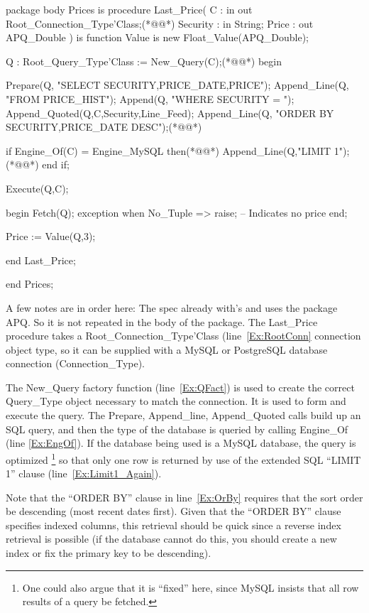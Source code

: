 \documentclass[english,letterpaper]{book}
\begin{document}
\begin{NumberedExample}
package body Prices is
   procedure Last_Price(
      C :        in out Root_Connection_Type'Class;(*@\label{Ex:RootConn}@*)
      Security : in     String;
      Price :       out APQ_Double
   ) is
      function Value is new Float_Value(APQ_Double);
  
      Q : Root_Query_Type'Class := New_Query(C);(*@\label{Ex:QFact}@*)
   begin
  
      Prepare(Q,     "SELECT SECURITY,PRICE_DATE,PRICE");
      Append_Line(Q, "FROM PRICE_HIST");
      Append(Q,      "WHERE SECURITY = ");
      Append_Quoted(Q,C,Security,Line_Feed);
      Append_Line(Q, "ORDER BY SECURITY,PRICE_DATE DESC");(*@\label{Ex:OrBy}@*)
 
      if Engine_Of(C) = Engine_MySQL then(*@\label{Ex:EngOf}@*)
         Append_Line(Q,"LIMIT 1");(*@\label{Ex:Limit1_Again}@*)
      end if;
 
      Execute(Q,C);
 
      begin
         Fetch(Q);
      exception
          when No_Tuple =>
             raise;    -- Indicates no price
      end;
 
      Price := Value(Q,3);
 
   end Last_Price;
 
end Prices;
\end{NumberedExample}

A few notes are in order here: The spec already with's and uses the
package APQ. So it is not repeated in the body of the package. The
Last\_Price procedure takes a Root\_Connection\_Type'Class
(line~\ref{Ex:RootConn} connection object type, so it can be supplied
with a MySQL or PostgreSQL database connection (Connection\_Type).

The New\_Query factory function (line~\ref{Ex:QFact}) is used to create
the correct Query\_Type object necessary to match the connection. It is
used to form and execute the query. The Prepare, Append\_line,
Append\_Quoted calls build up an SQL query, and then the type of the
database is queried by calling Engine\_Of (line \ref{Ex:EngOf}). If the
database being used is a MySQL database, the query is optimized
\footnote{One could also argue that it is {}``fixed'' here, since MySQL
insists that all row results of a query be fetched.} so that only one
row is returned by use of the extended SQL ``LIMIT 1'' clause
(line~\ref{Ex:Limit1_Again}).

Note that the ``ORDER BY'' clause in line~\ref{Ex:OrBy} requires that
the sort order be descending (most recent dates first). Given that the
``ORDER BY'' clause specifies indexed columns, this retrieval should
be quick since a reverse index retrieval is possible (if the database
cannot do this, you should create a new index or fix the primary key to
be descending).
\end{document}
